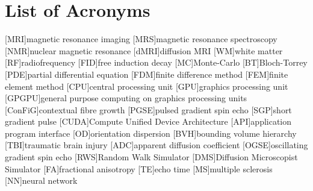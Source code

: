 \renewcommand{\BrainFuckChapter}{
{+}{+}{+}{+}{+}{+}{+}{+}{[}{>}{+}{+}{+}{+}{>}{+}{+}{+}{+}{+}{+}{>}{+}{+}{+}{+}{+}{+}{+}{+}{>}{+}{+}{+}{+}{+}{+}{+}{+}{+}{+}{>}{+}{+}{+}{+}{+}{+}{+}{+}{+}{+}{+}{+}{<}{<}{<}{<}{<}{-}{]}{>}{>}{>}{>}{-}{-}{-}{-}{.}
{>}{+}{+}{+}{+}{+}{+}{+}{+}{+}{.}{+}{+}{+}{+}{+}{+}{+}{+}{+}{+}{.}{+}{.}{<}{<}{<}{<}{.}{>}{>}{>}{>}{-}{-}{-}{-}{-}{.}{-}{-}{-}{-}{-}{-}{-}{-}{-}{.}{<}{<}{<}{<}{.}{>}{>}{+}{.}{>}{>}{-}{-}{-}{.}{+}{+}{+}{+}{+}{+}
{+}{+}{+}{+}{+}{+}{+}{+}{+}{.}{-}{-}{-}{.}{-}{.}{+}{+}{+}{+}{+}{+}{+}{+}{+}{+}{+}{.}{-}{-}{-}{-}{-}{-}{-}{-}{-}{-}{-}{-}{.}{+}{+}{+}{+}{+}{+}{.}{[}{>}{]}{<}{[}{[}{-}{]}{<}{]}{<}{-}{>}{-}{+}{-}{<}{-}{>}{-}{>}{+}
}
\chapter*{List of Acronyms}

\makeatletter
\patchcmd{\AC@@acro}{] #3}{] \MakeUppercase #3}{}{}
\patchcmd{\AC@@acro}{] #3}{] \MakeUppercase #3}{}{}
\makeatother
\begin{acronym}
  [MRI]{magnetic resonance imaging}
  [MRS]{magnetic resonance spectroscopy}
  [NMR]{nuclear magnetic resonance}
  [dMRI]{diffusion MRI}
  [WM]{white matter}
  [RF]{radiofrequency}
  [FID]{free induction decay}
  [MC]{Monte-Carlo}
  [BT]{Bloch-Torrey}
  [PDE]{partial differential equation}
  [FDM]{finite difference method}
  [FEM]{finite element method}
  [CPU]{central processing unit}
  [GPU]{graphics processing unit}
  [GPGPU]{general purpose computing on graphics processing units}
  [ConFiG]{contextual fibre growth}
  [PGSE]{pulsed gradient spin echo}
  [SGP]{short gradient pulse}
  [CUDA]{Compute Unified Device Architecture}
  [API]{application program interface}
  [OD]{orientation dispersion}
  [BVH]{bounding volume hierarchy}
  [TBI]{traumatic brain injury}
  [ADC]{apparent diffusion coefficient}
  [OGSE]{oscillating gradient spin echo}
  [RWS]{Random Walk Simulator}
  [DMS]{Diffusion Microscopist Simulator}
  [FA]{fractional anisotropy}
  [TE]{echo time}
  [MS]{multiple sclerosis}
  [NN]{neural network}
\end{acronym}


